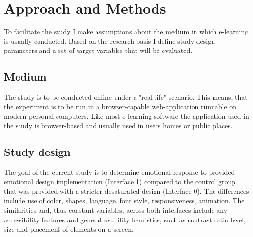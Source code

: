 \section{Approach and Methods}

To facilitate the study I make assumptions about the medium in which e-learning is usually conducted. Based on the research basis I define study design parameters and a set of target variables that will be evaluated.

	\subsection{Medium}
	
	The study is to be conducted online under a "real-life" scenario. This means, that the experiment is to be run in a browser-capable web-application runnable on modern personal computers. Like most e-learning software the  application used in the study is browser-based and usually used in users homes or public places.
	
	\subsection{Study design}
	
	The goal of the current study is to determine emotional response to provided emotional design implementation (Interface 1) compared to the control group that was provided with a stricter desaturated design (Interface 0). The differences include use of color, shapes, language, font style, responsiveness, animation. The similarities and, thus constant variables, across both interfaces include any accessibility features and general usability heuristics, such as contrast ratio level, size and placement of elements on a screen, 
	
